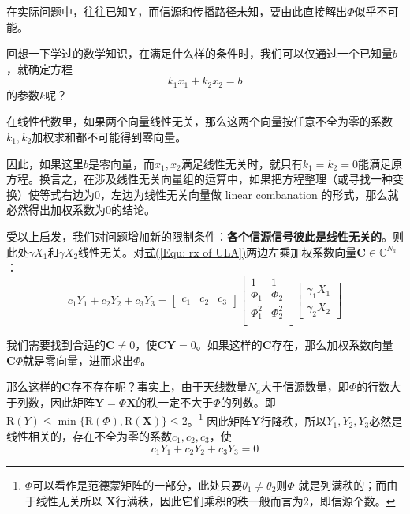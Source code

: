     在实际问题中，往往已知$\bm{Y}$，而信源和传播路径未知，要由此直接解出$\bm{\varPhi}$似乎不可能。

    回想一下学过的数学知识，在满足什么样的条件时，我们可以仅通过一个已知量$b$，就确定方程
    \begin{equation*}
        k_1 x_1 + k_2 x_2 = b
    \end{equation*}
    的参数$k$呢？

    在线性代数里，如果两个向量线性无关，那么这两个向量按任意不全为零的系数$k_1,k_2$加权求和都不可能得到零向量。

    因此，如果这里$b$是零向量，而$x_1,x_2$满足线性无关时，就只有$k_1=k_2=0$能满足原方程。换言之，在涉及线性无关向量组的运算中，如果把方程整理（或寻找一种变换）使等式右边为0，左边为线性无关向量做 linear combanation 的形式，那么就必然得出加权系数为0的结论。

    受以上启发，我们对问题增加新的限制条件：\textbf{各个信源信号彼此是线性无关的}。则此处$\gamma X_1$和$\gamma X_2$线性无关。对\hyperref[Equ: rx of ULA]{式(\ref*{Equ: rx of ULA})}两边左乘加权系数向量$\bm{C}\in \mathbb{C}^{N_a}$：
    \begin{equation}
            c_1Y_1+c_2Y_2+c_3Y_3
        =
        \begin{bmatrix}
            c_1 &c_2 &c_3
        \end{bmatrix}
        \begin{bmatrix}1 &1\\\varPhi_1 &\varPhi_2\\\varPhi_1^2 &\varPhi_2^2\\\end{bmatrix}
        \begin{bmatrix}
            \gamma_1 X_1\\
            \gamma_2 X_2
        \end{bmatrix}
    \end{equation}

    我们需要找到合适的$\bm{C}\neq 0$，使$\bm{C}\bm{Y}=0$。如果这样的$\bm{C}$存在，那么加权系数向量$\bm{C}\bm{\varPhi}$就是零向量，进而求出$\bm{\varPhi}$。

    那么这样的$\bm{C}$存不存在呢？事实上，由于天线数量$N_a$大于信源数量，即$\bm{\varPhi}$的行数大于列数，因此矩阵$\bm{Y}=\bm{\varPhi}\bm{X}$的秩一定不大于$\bm{\varPhi}$的列数。即$\mathrm{R}(Y)\leqslant \min\{\mathrm{R}(\bm{\varPhi}),\mathrm{R}(\bm{X})\}\leqslant 2$。\footnote[1]{$\bm{\varPhi}$可以看作是范德蒙矩阵的一部分，此处只要$\theta_1\neq\theta_2$则$\bm{\varPhi}$ 就是列满秩的；而由于线性无关所以 $\bm{X}$行满秩，因此它们乘积的秩一般而言为2，即信源个数。}  因此矩阵$\bm{Y}$行降秩，所以$Y_1,Y_2,Y_3$必然是线性相关的，存在不全为零的系数$c_1,c_2,c_3$，使
    \begin{equation*}
        c_1Y_1+c_2Y_2+c_3Y_3=0
    \end{equation*}

